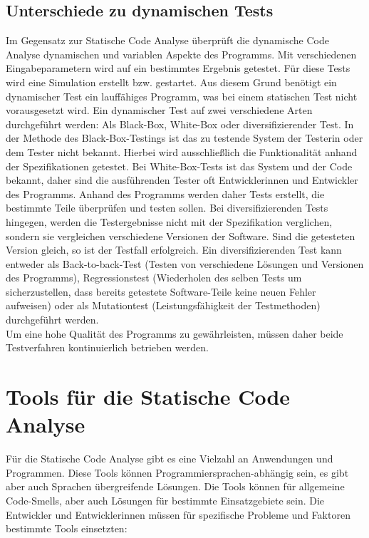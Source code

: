 \subsection{Unterschiede zu dynamischen Tests}
Im Gegensatz zur Statische Code Analyse überprüft die dynamische Code Analyse dynamischen und variablen Aspekte des Programms. Mit verschiedenen Eingabeparametern wird auf ein bestimmtes Ergebnis getestet. \cite{grigorenkoDynTest} Für diese Tests wird eine Simulation erstellt bzw. gestartet. Aus diesem Grund benötigt ein dynamischer Test ein lauffähiges Programm, was bei einem statischen Test nicht vorausgesetzt wird. Ein dynamischer Test auf zwei verschiedene Arten durchgeführt werden: Als Black-Box, White-Box oder diversifizierender Test.
In der Methode des Black-Box-Testings ist das zu testende System der Testerin oder dem Tester nicht bekannt. Hierbei wird ausschließlich die Funktionalität anhand der Spezifikationen getestet. Bei White-Box-Tests ist das System und der Code bekannt, daher sind die ausführenden Tester oft Entwicklerinnen und Entwickler des Programms. Anhand des Programms werden daher Tests erstellt, die bestimmte Teile überprüfen und testen sollen. Bei diversifizierenden Tests hingegen, werden die Testergebnisse nicht mit der Spezifikation verglichen, sondern sie vergleichen verschiedene Versionen der Software. Sind die getesteten Version gleich, so ist der Testfall erfolgreich. Ein diversifizierenden Test kann entweder als Back-to-back-Test (Testen von verschiedene Lösungen und Versionen des Programms), Regressionstest (Wiederholen des selben Tests um sicherzustellen, dass bereits getestete Software-Teile keine neuen Fehler aufweisen) oder als Mutationtest (Leistungsfähigkeit der Testmethoden) durchgeführt werden. \cite{bommer2016softwarewartung}\\
Um eine hohe Qualität des Programms zu gewährleisten, müssen daher beide Testverfahren kontinuierlich betrieben werden.
\section{Tools für die Statische Code Analyse}
Für die Statische Code Analyse gibt es eine Vielzahl an Anwendungen und Programmen. Diese Tools können Programmiersprachen-abhängig sein, es gibt aber auch Sprachen übergreifende Lösungen. Die Tools können für allgemeine Code-Smells, aber auch Lösungen für bestimmte Einsatzgebiete sein. Die Entwickler und Entwicklerinnen müssen für  spezifische Probleme und Faktoren bestimmte Tools einsetzten:

